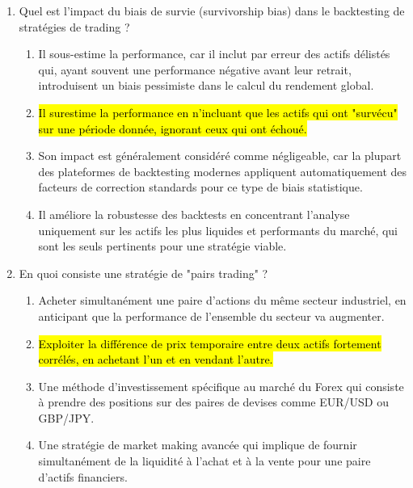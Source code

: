 \documentclass[a4paper,12pt]{article}
\begin{document}
\begin{enumerate}
    \item Quel est l'impact du biais de survie (survivorship bias) dans le backtesting de stratégies de trading ?
    \begin{enumerate}[label=(\Alph*)]
        \item Il sous-estime la performance, car il inclut par erreur des actifs délistés qui, ayant souvent une performance négative avant leur retrait, introduisent un biais pessimiste dans le calcul du rendement global.
        \item \hl{Il surestime la performance en n'incluant que les actifs qui ont "survécu" sur une période donnée, ignorant ceux qui ont échoué.}
        \item Son impact est généralement considéré comme négligeable, car la plupart des plateformes de backtesting modernes appliquent automatiquement des facteurs de correction standards pour ce type de biais statistique.
        \item Il améliore la robustesse des backtests en concentrant l'analyse uniquement sur les actifs les plus liquides et performants du marché, qui sont les seuls pertinents pour une stratégie viable.
    \end{enumerate}

    \item En quoi consiste une stratégie de "pairs trading" ?
    \begin{enumerate}[label=(\Alph*)]
        \item Acheter simultanément une paire d'actions du même secteur industriel, en anticipant que la performance de l'ensemble du secteur va augmenter.
        \item \hl{Exploiter la différence de prix temporaire entre deux actifs fortement corrélés, en achetant l'un et en vendant l'autre.}
        \item Une méthode d'investissement spécifique au marché du Forex qui consiste à prendre des positions sur des paires de devises comme EUR/USD ou GBP/JPY.
        \item Une stratégie de market making avancée qui implique de fournir simultanément de la liquidité à l'achat et à la vente pour une paire d'actifs financiers.
    \end{enumerate}
    

\end{enumerate}
\end{document}
